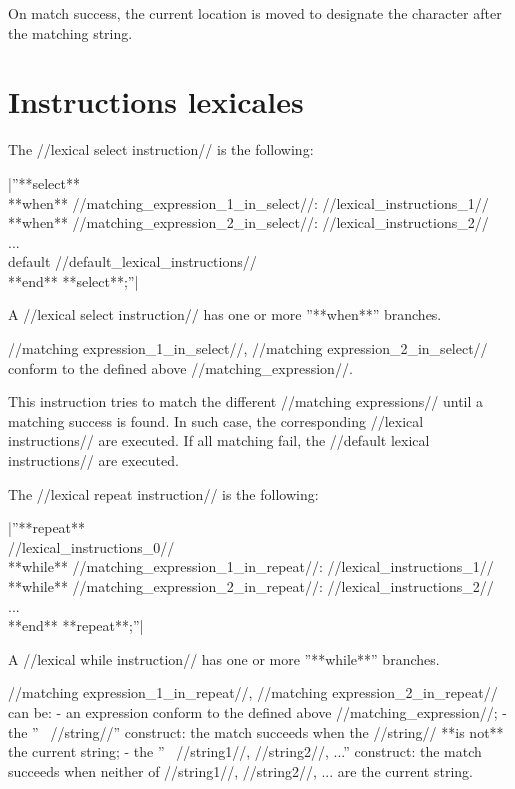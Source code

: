 On match success, the current location is moved to designate the character after the matching string.

\section{Instructions lexicales}



The //lexical select instruction// is the following:

|''**select**\\ **when** //matching\_expression\_1\_in\_select//: //lexical\_instructions\_1//\\ **when** //matching\_expression\_2\_in\_select//: //lexical\_instructions\_2//\\ ...\\ default //default\_lexical\_instructions//\\ **end** **select**;''|

A //lexical select instruction// has one or more ''**when**'' branches.

//matching expression\_1\_in\_select//, //matching expression\_2\_in\_select// conform to the defined above //matching\_expression//.

This instruction tries to match the different //matching expressions// until a matching success is found. In such case, the corresponding //lexical instructions// are executed. If all matching fail, the //default lexical instructions// are executed.


The //lexical repeat instruction// is the following:

|''**repeat**\\  //lexical\_instructions\_0//\\ **while** //matching\_expression\_1\_in\_repeat//: //lexical\_instructions\_1//\\ **while** //matching\_expression\_2\_in\_repeat//: //lexical\_instructions\_2//\\ ...\\ **end** **repeat**;''|

A //lexical while instruction// has one or more ''**while**'' branches.

//matching expression\_1\_in\_repeat//, //matching expression\_2\_in\_repeat// can be:
  - an expression conform to the defined above //matching\_expression//;
  - the ''~ //string//'' construct: the match succeeds when the //string// **is not** the current string;
  - the ''~ //string1//, //string2//, ...'' construct: the match succeeds when neither of //string1//, //string2//, ... are the current string.

